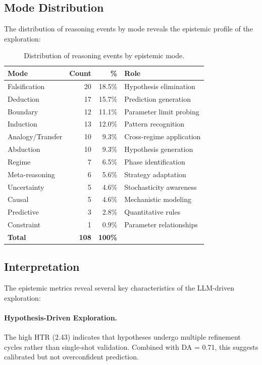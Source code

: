 \documentclass[10pt,twocolumn]{article}
\begin{document}
\subsection{Mode Distribution}

The distribution of reasoning events by mode reveals the epistemic profile of the exploration:

\begin{table}[htbp]
\centering
\caption{Distribution of reasoning events by epistemic mode.}
\label{tab:mode_distribution}
\begin{tabular}{lrrp{5cm}}
\toprule
\textbf{Mode} & \textbf{Count} & \textbf{\%} & \textbf{Role} \\
\midrule
Falsification & 20 & 18.5\% & Hypothesis elimination \\
Deduction & 17 & 15.7\% & Prediction generation \\
Boundary & 12 & 11.1\% & Parameter limit probing \\
Induction & 13 & 12.0\% & Pattern recognition \\
Analogy/Transfer & 10 & 9.3\% & Cross-regime application \\
Abduction & 10 & 9.3\% & Hypothesis generation \\
Regime & 7 & 6.5\% & Phase identification \\
Meta-reasoning & 6 & 5.6\% & Strategy adaptation \\
Uncertainty & 5 & 4.6\% & Stochasticity awareness \\
Causal & 5 & 4.6\% & Mechanistic modeling \\
Predictive & 3 & 2.8\% & Quantitative rules \\
Constraint & 1 & 0.9\% & Parameter relationships \\
\midrule
\textbf{Total} & \textbf{108} & \textbf{100\%} & \\
\bottomrule
\end{tabular}
\end{table}

\subsection{Interpretation}

The epistemic metrics reveal several key characteristics of the LLM-driven exploration:

\paragraph{Hypothesis-Driven Exploration.} The high HTR (2.43) indicates that hypotheses undergo multiple refinement cycles rather than single-shot validation. Combined with DA = 0.71, this suggests calibrated but not overconfident prediction.
\end{document}
